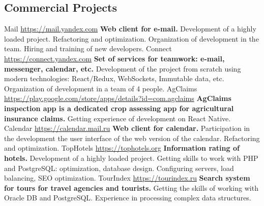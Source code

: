 \documentclass[11pt,a4paper]{moderncv}
\begin{document}
  \subsection{Commercial Projects}
  \cvline
    {Mail}
    {\url{https://mail.yandex.com}\newline{}
    \textbf{Web client for e-mail.}\newline{}
    Development of a highly loaded project. Refactoring and optimization.\newline{}
    Organization of development in the team. Hiring and training of new developers.}
  \cvline
    {Connect}
    {\url{https://connect.yandex.com}\newline{}
    \textbf{Set of services for teamwork: e-mail, messenger, calendar, etc.}\newline{}
    Development of the project from scratch using modern technologies:
    React/Redux, WebSockets, Immutable data, etc.
    Organization of development in a team of 4 people.}
  \cvline
    {AgClaims}
    {\url{https://play.google.com/store/apps/details?id=com.agclaims}\newline{}
    \textbf{AgClaims inspection app is a dedicated crop assessing app for agricultural insurance claims.}\newline{}
    Getting experience of development on React Native.}
  \cvline
    {Calendar}
    {\url{https://calendar.mail.ru}\newline{}
    \textbf{Web client for calendar.}\newline{}
    Participation in the development the user interface of the web version of the calendar.\newline{}
    Refactoring and optimization.}
  \cvline
    {TopHotels}
    {\url{https://tophotels.org}\newline{}
    \textbf{Information rating of hotels.}\newline{}
    Development of a highly loaded project.
    Getting skills to work with PHP and PostgreSQL: optimization, database design.
    Configuring servers, load balancing, SEO optimization.}
  \cvline
    {TourIndex}
    {\url{https://tourindex.ru}\newline{}
    \textbf{Search system for tours for travel agencies and tourists.}\newline{}
    Getting the skills of working with Oracle DB and PostgreSQL.
    Experience in processing complex data structures.}
\end{document}
